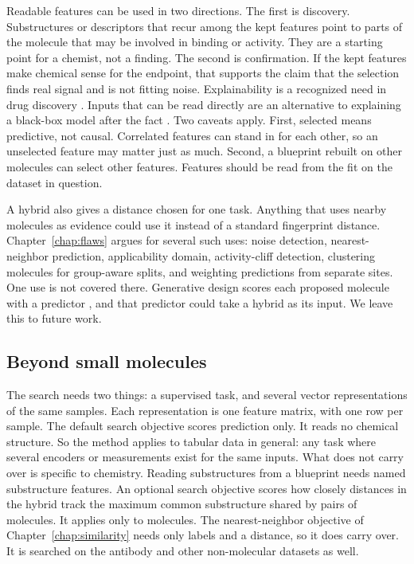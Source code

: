 Readable features can be used in two directions. The first is discovery. Substructures or descriptors that recur among the kept features point to parts of the molecule that may be involved in binding or activity. They are a starting point for a chemist, not a finding. The second is confirmation. If the kept features make chemical sense for the endpoint, that supports the claim that the selection finds real signal and is not fitting noise. Explainability is a recognized need in drug discovery \citep{JimenezLuna2020}. Inputs that can be read directly are an alternative to explaining a black-box model after the fact \citep{Rudin2019}. Two caveats apply. First, selected means predictive, not causal. Correlated features can stand in for each other, so an unselected feature may matter just as much. Second, a blueprint rebuilt on other molecules can select other features. Features should be read from the fit on the dataset in question.

A hybrid also gives a distance chosen for one task. Anything that uses nearby molecules as evidence could use it instead of a standard fingerprint distance. Chapter~\ref{chap:flaws} argues for several such uses: noise detection, nearest-neighbor prediction, applicability domain, activity-cliff detection, clustering molecules for group-aware splits, and weighting predictions from separate sites. One use is not covered there. Generative design scores each proposed molecule with a predictor \citep{Olivecrona2017}, and that predictor could take a hybrid as its input. We leave this to future work.


\subsection{Beyond small molecules}

The search needs two things: a supervised task, and several vector representations of the same samples. Each representation is one feature matrix, with one row per sample. The default search objective scores prediction only. It reads no chemical structure. So the method applies to tabular data in general: any task where several encoders or measurements exist for the same inputs. What does not carry over is specific to chemistry. Reading substructures from a blueprint needs named substructure features. An optional search objective scores how closely distances in the hybrid track the maximum common substructure shared by pairs of molecules. It applies only to molecules. The nearest-neighbor objective of Chapter~\ref{chap:similarity} needs only labels and a distance, so it does carry over. It is searched on the antibody and other non-molecular datasets as well.

